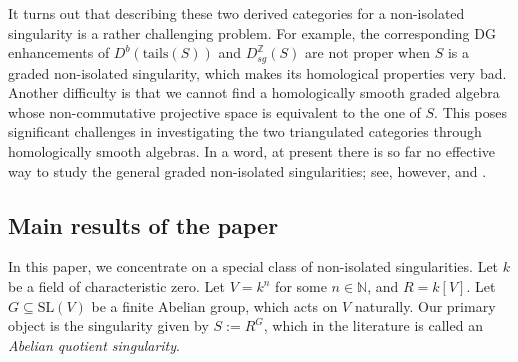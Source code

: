 \documentclass[11pt,reqno]{amsart}
\theoremstyle{definition}
\begin{document}
It turns out that describing these two derived categories for
a non-isolated singularity is a rather challenging problem.
For example, the corresponding DG enhancements of 
$D^{b}(\mathrm{tails}(S))$ and $D_{sg}^{\mathbb Z}(S)$ 
are not proper 
when $S$ is a graded non-isolated singularity, which 
makes its homological properties very bad. Another difficulty
is that
we cannot find a homologically
smooth graded algebra 
whose non-commutative projective space is equivalent to the one of $S$. 
This poses significant challenges in investigating the two   
triangulated categories through homologically smooth algebras.
In a word, at present there is so far no  
effective way to study the general graded non-isolated singularities; see, however,
\cite{IW} and \cite{BYu}.   



\subsection{Main results of the paper}

In this paper, we concentrate on a special class of
non-isolated singularities.
Let $k$ be a field of characteristic zero. Let $V=k^n$ 
for some $n \in \mathbb{N}$, and $R=k[V]$.
Let $G \subseteq \mathrm{SL}(V)$ be a 
finite Abelian group, which acts on $V$ naturally. Our primary object 
is the singularity given by $S:= R^G$, which in the literature
is called an {\it Abelian
quotient singularity}.
\end{document}
